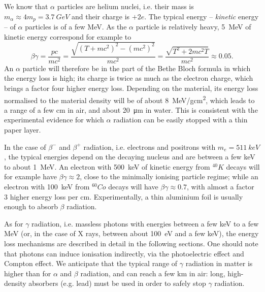 We know that \(\alpha\) particles are helium nuclei, i.e. their mass is \(m_\alpha\approx4m_p=\SI{3.7}{GeV}\) and their charge is $+2e$. The typical energy -- \emph{kinetic} energy -- of \(\alpha\) particles is of a few \si{MeV}. As the \(\alpha\) particle is relatively heavy, \SI{5}{MeV} of kinetic energy correspond for example to
\[\beta\gamma = \frac{pc}{mc^2} = \frac{\sqrt{(T+mc^2)^2-(mc^2)^2}}{mc^2} = \frac{\sqrt{T^2+2mc^2T}}{mc^2} \approx 0.05.\]
An $\alpha$ particle will therefore be in the part of the Bethe Bloch formula in which the energy loss is high; its charge is twice as much as the electron charge, which brings  a factor four higher energy loss. Depending on the material, its energy loss normalised to the material density will be of about \SI{8}{MeV/gcm^2}, which leads to a range of a few \si{cm} in air, and about \SI{20}{\micro m} in water. This is consistent with the experimental evidence for which \(\alpha\) radiation can be easily stopped with a thin paper layer.

In the case of $\beta^-$ and $\beta^+$ radiation, i.e. electrons and positrons with $m_e=\SI{511}{keV}$, the typical energies depend on the decaying nucleus and are between a few \si{keV} to about \SI{1}{MeV}. An electron with \SI{500}{keV} of kinetic energy from \(^{40}K\) decays will for example have \(\beta\gamma\approx2\), close to the minimally ionising particle regime; while an electron with \SI{100}{keV} from \(^{60}Co\) decays will have \(\beta\gamma\approx0.7\), with almost a factor \(3\) higher energy loss per \si{cm}.
Experimentally, a thin aluminium foil is usually enough to absorb $\beta$ radiation.

As for $\gamma$ radiation, i.e. massless photons with energies between a few \si{keV} to a few \si{MeV} (or, in the case of X rays, between about \SI{100}{eV} and a few \si{keV}), the energy loss mechanisms are described in detail in the following sections. One should note that photons can induce ionisation indirectly, via the photoelectric effect and Compton effect. We anticipate that the typical range of $\gamma$ radiation in matter is higher than for $\alpha$ and $\beta$ radiation, and can reach a few \si{km} in air: long, high-density absorbers (e.g. lead) must be used in order to safely stop $\gamma$ radiation.
 
